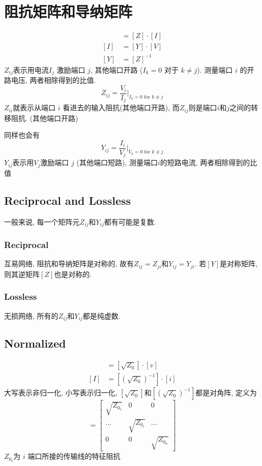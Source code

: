 \documentclass[a4paper]{report}
\begin{document}
\section{阻抗矩阵和导纳矩阵}
\begin{align}
  [V]&=[Z]\cdot [I]
  \\ [I]&=[Y] \cdot [V]
  \\ [Y]&=[Z]^{-1}
\end{align}
 $Z_{ij}$表示用电流$I_j$ 激励端口 $j$, 其他端口开路 ($I_k=0\text{ 对于 } k\neq j$). 测量端口 $i$ 的开路电压, 两者相除得到的比值. 
$$Z_{ij}=\frac{V_i}{I_j}\bigl\vert_{I_k=0\text{ for } k\neq j}$$
$Z_{ii}$就表示从端口 $i$ 看进去的输入阻抗(其他端口开路), 而$Z_{ij}$则是端口$i$和$j$之间的转移阻抗. (其他端口开路)

同样也会有
$$Y_{ij}=\frac{I_i}{V_j}\bigl\vert_{V_k=0\text{ for } k\neq j}$$
$Y_{ij}$表示用$V_j$激励端口 $j$ (其他端口短路), 测量端口$i$的短路电流, 两者相除得到的比值

\subsection{Reciprocal and Lossless}
一般来说, 每一个矩阵元$Z_{ij}$和$Y_{ij}$都有可能是复数. 
\subsubsection{Reciprocal}
互易网络, 阻抗和导纳矩阵是对称的, 故有$Z_{ij}=Z_{ji}$和$Y_{ij}=Y_{ji}$. 若$[Y]$是对称矩阵, 则其逆矩阵$[Z]$也是对称的. 
\subsubsection{Lossless}
无损网络, 所有的$Z_{ij}$和$Y_{ij}$都是纯虚数. 
\subsection{Normalized}
\begin{align*}
  [V]&=[\sqrt{Z_0}]\cdot [v]
  \\ [I]&=[(\sqrt{Z_0})^{-1}]\cdot [i]
\end{align*}
大写表示非归一化, 小写表示归一化, $[\sqrt{Z_0}]$和$[(\sqrt{Z_0})^{-1}]$都是对角阵, 定义为
\begin{equation}
  [\sqrt{Z_0}]
  =\begin{bmatrix}
    \sqrt{Z_{0_1}}&0&0
    \\    \dots&\sqrt{Z_{0_i}}&\dots
    \\    0&0&\sqrt{Z_{0_n}}
  \end{bmatrix}
\end{equation}
$Z_{0_i}$为 $i$ 端口所接的传输线的特征阻抗
\end{document}
